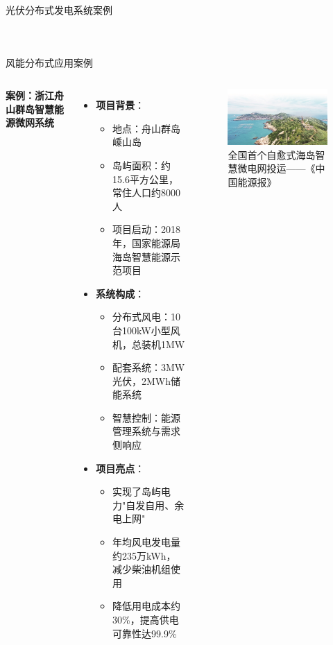 \documentclass[aspectratio=169]{beamer}
\begin{document}
\begin{frame}{光伏分布式发电系统案例}
\begin{columns}
\begin{figure}
    \end{figure}
  \end{columns}
\end{frame}

\begin{frame}{风能分布式应用案例}
  \begin{columns}
    \textbf{案例：浙江舟山群岛智慧能源微网系统}
    \begin{itemize}
      \item \textbf{项目背景}：
        \begin{itemize}
          \item 地点：舟山群岛嵊山岛
          \item 岛屿面积：约15.6平方公里，常住人口约8000人
          \item 项目启动：2018年，国家能源局海岛智慧能源示范项目\cite{Chen2021}
        \end{itemize}
      \item \textbf{系统构成}：
        \begin{itemize}
          \item 分布式风电：10台100kW小型风机，总装机1MW
          \item 配套系统：3MW光伏，2MWh储能系统
          \item 智慧控制：能源管理系统与需求侧响应
        \end{itemize}
      \item \textbf{项目亮点}：
        \begin{itemize}
          \item 实现了岛屿电力"自发自用、余电上网"
          \item 年均风电发电量约235万kWh，减少柴油机组使用
          \item 降低用电成本约30\%，提高供电可靠性达99.9\%
        \end{itemize}
    \end{itemize}
    \begin{figure}
      \centering
      \caption{全国首个自愈式海岛智慧微电网投运——《中国能源报》}
      \includegraphics[width=\textwidth]{fig/全国首个自愈式海岛智慧微电网投运.jpg}
    \end{figure}
  \end{columns}
\end{frame}
\end{document}
